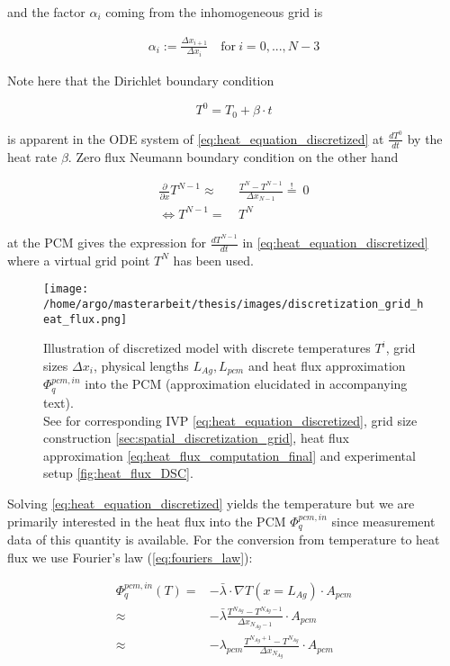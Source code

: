 \documentclass{scrartcl}[12pt, halfparskip]
\numberwithin{equation}{section}
\numberwithin{figure}{section}
\numberwithin{table}{section}
\begin{document}
and the factor $\alpha_i$ coming from the inhomogeneous grid is

\begin{align}
	\alpha_i := \frac{\Delta x_{i+1}}{\Delta x_{i}} \quad \text{for} \ i=0,...,N-3
\end{align}


Note here that the Dirichlet boundary condition 

\begin{equation}
	T^0 = T_0 + \beta \cdot t
\end{equation}

is apparent in the ODE system of \cref{eq:heat_equation_discretized} at $\frac{dT^0}{dt}$ by the heat rate $\beta$. Zero flux Neumann boundary condition on the other hand

\begin{align}
	\frac{\partial}{\partial x} T^{N-1} \approx & \ \frac{T^N - T^{N-1}}{\Delta x_{N-1}} \stackrel{!}{=} \ 0 \\
	\Leftrightarrow T^{N-1} = & \ T^N \nonumber 
\end{align}



 at the PCM gives the expression for $\frac{d T^{N-1}}{dt}$ in \cref{eq:heat_equation_discretized} where a virtual grid point $T^N$ has been used.

\begin{figure}[H]
	\centering
	\texttt{[image: /home/argo/masterarbeit/thesis/images/discretization\_grid\_heat\_flux.png]}
	\caption{Illustration of discretized model with discrete temperatures $T^i$, grid sizes $\Delta x_i$, physical lengths $L_{Ag}, L_{pcm}$ and heat flux approximation $\varPhi_q^{pcm,in}$ into the PCM (approximation elucidated in accompanying text). \\
	See for	corresponding IVP \cref{eq:heat_equation_discretized}, grid size construction \cref{sec:spatial_discretization_grid}, heat flux approximation \cref{eq:heat_flux_computation_final} and experimental setup \cref{fig:heat_flux_DSC}.}
	\label{fig:mathematical_model_discretized}
\end{figure}


Solving \cref{eq:heat_equation_discretized} yields the temperature but we are primarily interested in the heat flux into the PCM $\varPhi_{q}^{pcm,in}$ since measurement data of this quantity is available. For the conversion from temperature to heat flux we use Fourier's law (\cref{eq:fouriers_law}):

\begin{align}
	\varPhi_{q}^{pcm,in}(T) = & - \bar{\lambda} \cdot \nabla T (x=L_{Ag}) \cdot A_{pcm} \\
	\approx & - \bar{\lambda} \frac{T^{N_{Ag}} - T^{N_{Ag}-1}}{\Delta x_{N_{Ag}-1}} \cdot A_{pcm} \nonumber \\
	\approx & - \lambda_{pcm} \frac{T^{N_{Ag}+1} - T^{N_{Ag}}}{\Delta x_{N_{Ag}}} \cdot A_{pcm} \nonumber
\end{align}
\end{document}
